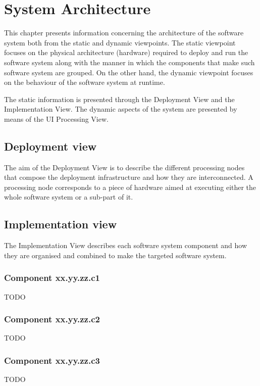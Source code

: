 \chapter{System Architecture}
\label{chap:arch}

This chapter presents information concerning the architecture of the software
system both from the static and dynamic viewpoints. The static viewpoint focuses
on the physical architecture (hardware) required to deploy and run the
software system along with the manner in which the components that make such
software system are grouped. On the other hand, the dynamic viewpoint focuses on
the behaviour of the software system at runtime. 

The static information is presented through the \gls{Deployment View} and the
\gls{Implementation View}. The dynamic aspects of the system are presented by
means of the \gls{UI Processing View}.


\section{Deployment view}
The aim of the \gls{Deployment View} is to describe the different processing nodes that compose
the deployment infrastructure and how they are interconnected. A processing node
corresponds to a piece of hardware aimed at executing either the whole software
system or a sub-part of it.




\section{Implementation view}
The \gls{Implementation View} describes each software system component and how
they are organised and combined to make the targeted software system.




\subsection{Component xx.yy.zz.c1}
TODO

\subsection{Component xx.yy.zz.c2}
TODO

\subsection{Component xx.yy.zz.c3}
TODO





